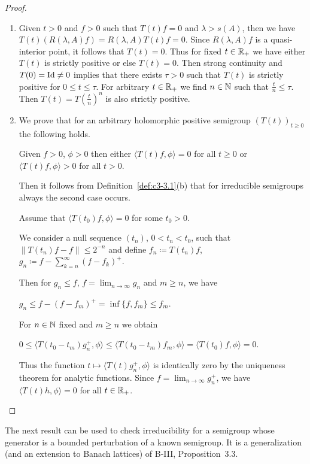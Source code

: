 \begin{proof}
\begin{enumerate}[\upshape (i), wide, labelindent=.5em]
	\item
	Given $t > 0$ and $f > 0$ such that $T(t)f = 0$ and $\lambda > s(A)$, then we have $T(t)(R(\lambda,A)f) = R(\lambda,A)T(t)f = 0$.
	Since $R(\lambda,A)f$ is a quasi-interior point, it follows that $T(t) = 0$.
	Thus for fixed $t \in \mathbb{R} _{+}$ we have either $T(t)$ is strictly positive or else $T(t) = 0$.
	Then strong continuity and $T(0) = \operatorname{Id} \neq 0$ implies that there exists $\tau > 0$ such that $T(t)$ is strictly positive for $0 \leq t \leq \tau$.
	For arbitrary $t \in \mathbb{R} _{+}$ we find $n \in \mathbb{N}$ such that $\frac{t}{n} \leq \tau$.
	Then $T(t) = T(\frac{t}{n})^{n}$ is also strictly positive.
	
	\item
	We prove that for an arbitrary holomorphic positive semigroup $(T(t))_{t\geq 0}$ the following holds.
	
	Given $f > 0$, $\phi > 0$ then either $\langle T(t)f,\phi \rangle = 0$ for all $t \geq 0$ or $\langle T(t)f,\phi \rangle > 0$ for all $t > 0$.
	
	Then it follows from Definition~\ref{def:c3-3.1}(b) that for irreducible semigroups always the second case occurs.
	
	Assume that $\langle T(t_{0})f,\phi \rangle = 0$ for some $t_{0} > 0$.
	
	We consider a null sequence $(t_{n})$, $0 < t_{n} < t_{0}$, such that $\|T(t_{n})f - f\| \leq 2^{-n}$ and define $f_{n} \coloneqq T(t_{n})f$, $g_{n} \coloneqq f - \sum_{k=n}^{\infty}(f-f_{k})^{+}$.
	
	Then for $g_{n} \leq f$, $f = \lim_{n\to\infty}g_{n}$ and $m \geq n$, 
	we have 
	
	$g_{n} \leq f - (f-f_{m})^{+} = \inf\{f,f_{m}\} \leq f_{m}$.
	
	For $n \in \mathbb{N}$ fixed and $m \geq n$ we obtain 
	
	$0 \leq \langle T(t_{0}-t_{m})g_{n}^{+},\phi \rangle \leq \langle T(t_{0}-t_{m})f_{m},\phi \rangle = \langle T(t_{0})f,\phi \rangle = 0$.
	
	Thus the function $t \mapsto \langle T(t)g_{n}^{+},\phi \rangle$ is identically zero by the uniqueness theorem for analytic functions.
	Since $f = \lim_{n\to\infty}g_{n}^{+}$, we have $\langle T(t)h,\phi \rangle = 0$ for all $t \in \mathbb{R} _{+}$.
\end{enumerate}
\end{proof}
The next result can be used to check irreducibility for a semigroup whose generator is a bounded perturbation of a known semigroup. It is a generalization (and an extension to Banach lattices) of B-III, Proposition~3.3. 

